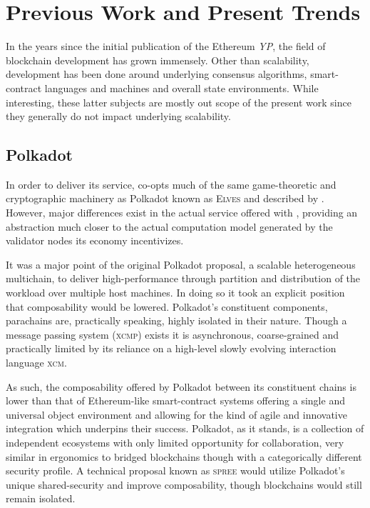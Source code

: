 \section{Previous Work and Present Trends}\label{sec:previouswork}

In the years since the initial publication of the Ethereum \emph{YP}, the field of blockchain development has grown immensely. Other than scalability, development has been done around underlying consensus algorithms, smart-contract languages and machines and overall state environments. While interesting, these latter subjects are mostly out scope of the present work since they generally do not impact underlying scalability.

\subsection{Polkadot}

In order to deliver its service, \Jam co-opts much of the same game-theoretic and cryptographic machinery as Polkadot known as \textsc{Elves} and described by \cite{stewart2018efficient}. However, major differences exist in the actual service offered with \Jam, providing an abstraction much closer to the actual computation model generated by the validator nodes its economy incentivizes.

It was a major point of the original Polkadot proposal, a scalable heterogeneous multichain, to deliver high-performance through partition and distribution of the workload over multiple host machines. In doing so it took an explicit position that composability would be lowered. Polkadot's constituent components, parachains are, practically speaking, highly isolated in their nature. Though a message passing system (\textsc{xcmp}) exists it is asynchronous, coarse-grained and practically limited by its reliance on a high-level slowly evolving interaction language \textsc{xcm}.

As such, the composability offered by Polkadot between its constituent chains is lower than that of Ethereum-like smart-contract systems offering a single and universal object environment and allowing for the kind of agile and innovative integration which underpins their success. Polkadot, as it stands, is a collection of independent ecosystems with only limited opportunity for collaboration, very similar in ergonomics to bridged blockchains though with a categorically different security profile. A technical proposal known as \textsc{spree} would utilize Polkadot's unique shared-security and improve composability, though blockchains would still remain isolated.

